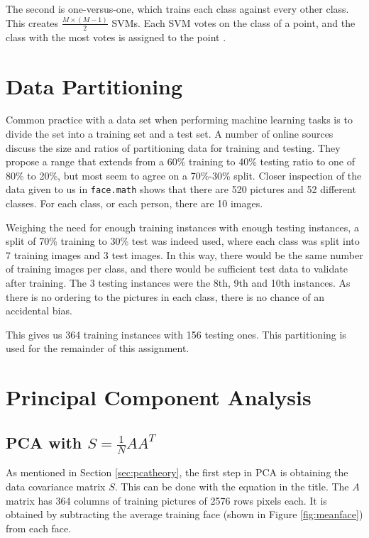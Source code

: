 \documentclass[a4paper, 10pt, conference]{ieeeconf}
\begin{document}
The second is one-versus-one, which trains each class against every other class. This creates $\frac{M \times (M-1)}{2}$ SVMs. Each SVM votes on the class of a point, and the class with the most votes is assigned to the point \cite{svm}.

%
\section{Data Partitioning}
Common practice with a data set when performing machine learning tasks is to divide the set into a training set and a test set. A number of online sources discuss the size and ratios of partitioning data for training and testing. They propose a range that extends from a 60\% training to 40\% testing ratio to one of 80\% to 20\%, but most seem to agree on a 70\%-30\% split. Closer inspection of the data given to us in \texttt{face.math} shows that there are 520 pictures and 52 different classes. For each class, or each person, there are 10 images.

Weighing the need for enough training instances with enough testing instances, a split of 70\% training to 30\% test was indeed used, where each class was split into 7 training images and 3 test images. In this way, there would be the same number of training images per class, and there would be sufficient test data to validate after training. The 3 testing instances were the 8th, 9th and 10th instances. As there is no ordering to the pictures in each class, there is no chance of an accidental bias.

This gives us 364 training instances with 156 testing ones. This partitioning is used for the remainder of this assignment.

\section{Principal Component Analysis}


\subsection{PCA with $S = \frac{1}{N}AA^{T}$}
As mentioned in Section \ref{sec:pcatheory}, the first step in PCA is obtaining the data covariance matrix $S$. This can be done with the equation in the title. The $A$ matrix has 364 columns of training pictures of 2576 rows pixels each. It is obtained by subtracting the average training face (shown in Figure \ref{fig:meanface}) from each face.
\end{document}
